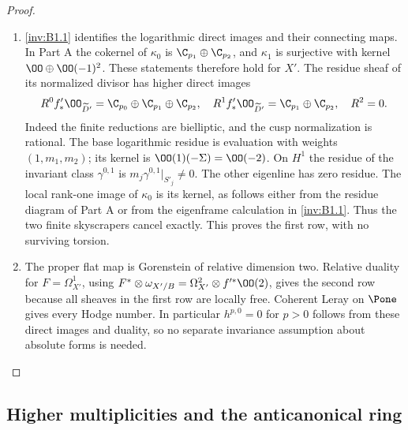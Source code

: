 \begin{proof}
\begin{enumerate}[label=\arabic*.,leftmargin=*]
\item \ref{inv:B1.1} identifies the logarithmic direct images and their connecting maps.
In Part A the cokernel of $\kappa_0$ is
$\C_{p_1}\oplus\C_{p_2}$, and $\kappa_1$ is surjective with kernel
$\OO\oplus\OO(-1)^2$. These statements therefore hold for $X'$.
The residue sheaf of its normalized divisor has higher direct images
\[
R^0f'_*\OO_{\widetilde D'}=\C_{p_0}\oplus\C_{p_1}\oplus\C_{p_2},
\quad R^1f'_*\OO_{\widetilde D'}=\C_{p_1}\oplus\C_{p_2},
\quad R^2=0.
\]
Indeed the finite reductions are bielliptic, and the cusp normalization
is rational. The base logarithmic residue is evaluation with weights
$(1,m_1,m_2)$; its kernel is $\OO(1)(-\Sigma)=\OO(-2)$.
On $H^1$ the residue of the invariant class $\gamma^{0,1}$ is
$m_j\gamma^{0,1}|_{S'_j}\ne0$. The other eigenline has zero residue.
The local rank-one image of $\kappa_0$ is its kernel, as follows either
from the residue diagram of Part A or from the eigenframe calculation
in \ref{inv:B1.1}. Thus the two finite skyscrapers cancel exactly. This proves
the first row, with no surviving torsion.

\item The proper flat map is Gorenstein of relative dimension two. Relative
duality for $F=\Omega^1_{X'}$, using
$F^*\otimes\omega_{X'/B}=\Omega^2_{X'}\otimes f'^*\OO(2)$,
gives the second row because all sheaves in the first row are locally
free. Coherent Leray on $\Pone$ gives every Hodge number. In particular
$h^{p,0}=0$ for $p>0$ follows from these direct images and duality,
so no separate invariance assumption about absolute forms is needed.
\end{enumerate}
\end{proof}

\subsection{Higher multiplicities and the anticanonical ring}

